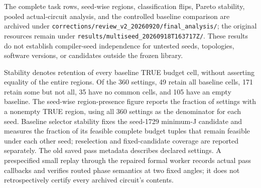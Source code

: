 The complete task rows, seed-wise regions, classification flips, Pareto
stability, pooled actual-circuit analysis, and the controlled baseline
comparison are archived under
\texttt{corrections/review\_v2\_20260920/final\_analysis/}; the original resources remain under \texttt{results/multiseed\_20260918T163717Z/}.  These results do not establish
compiler-seed independence for untested seeds, topologies, software versions,
or candidates outside the frozen library.


Stability denotes retention of every baseline TRUE budget cell, without
asserting equality of the entire regions.  Of the 360 settings, 49 retain
all baseline cells, 171 retain some but not all, 35 have no common cells,
and 105 have an empty baseline.  The seed-wise region-presence figure reports
the fraction of settings with a nonempty TRUE region, using all 360 settings
as the denominator for each seed.  Baseline selector stability fixes the
seed-1729 minimum-J candidate and measures the fraction of its feasible
complete budget tuples that remain feasible under each other seed;
reselection and fixed-candidate coverage are reported separately.
The old saved pass metadata describes declared settings.  A prespecified
small replay through the repaired formal worker records actual pass callbacks
and verifies routed phase semantics at two fixed angles; it does not retrospectively
certify every archived circuit's contents.


